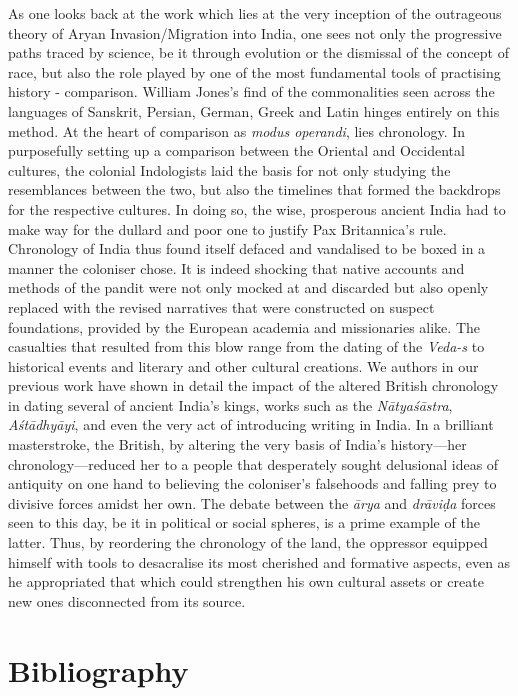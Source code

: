 As one looks back at the work which lies at the very inception of the outrageous theory of Aryan Invasion/Migration into India, one sees not only the progressive paths traced by science, be it through evolution or the dismissal of the concept of race, but also the role played by one of the most fundamental tools of practising history - comparison. William Jones’s find of the commonalities seen across the languages of Sanskrit, Persian, German, Greek and Latin hinges entirely on this method. At the heart of comparison as \textit{modus operandi}, lies chronology. In purposefully setting up a comparison between the Oriental and Occidental cultures, the colonial Indologists laid the basis for not only studying the resemblances between the two, but also the timelines that formed the backdrops for the respective cultures. In doing so, the wise, prosperous ancient India had to make way for the dullard and poor one to justify Pax Britannica’s rule. Chronology of India thus found itself defaced and vandalised to be boxed in a manner the coloniser chose. It is indeed shocking that native accounts and methods of the pandit were not only mocked at and discarded but also openly replaced with the revised narratives that were constructed on suspect foundations, provided by the European academia and missionaries alike. The casualties that resulted from this blow range from the dating of the \textit{Veda-s} to historical events and literary and other cultural creations. We authors in our previous work have shown in detail the impact of the altered British chronology in dating several of ancient India’s kings, works such as the \textit{Nātyaśāstra}, \textit{Aśtādhyāyi}, and even the very act of introducing writing in India. In a brilliant masterstroke, the British, by altering the very basis of India’s history—her chronology—reduced her to a people that desperately sought delusional ideas of antiquity on one hand to believing the coloniser’s falsehoods and falling prey to divisive forces amidst her own. The debate between the \textit{ārya} and \textit{drāviḍa} forces seen to this day, be it in political or social spheres, is a prime example of the latter. Thus, by reordering the chronology of the land, the oppressor equipped himself with tools to desacralise its most cherished and formative aspects, even as he appropriated that which could strengthen his own cultural assets or create new ones disconnected from its source.


\section*{Bibliography}

